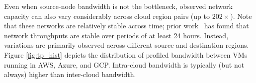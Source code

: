 Even when source-node bandwidth is not the bottleneck, observed network capacity can also vary considerably across cloud region pairs (up to $202\times$).
%
Note that these networks are relatively stable across time; prior work~\cite{jain2022skyplane} has found that network throughputs are stable over periods of at least 24 hours.
%
Instead, variations are primarily observed across different source and destination regions.
% 
Figure \ref{fig:tp_hist} depicts the distribution of profiled bandwidth between VMs running in AWS, Azure, and GCP.
% 
Intra-cloud bandwidth is typically (but not always) higher than inter-cloud bandwidth.




